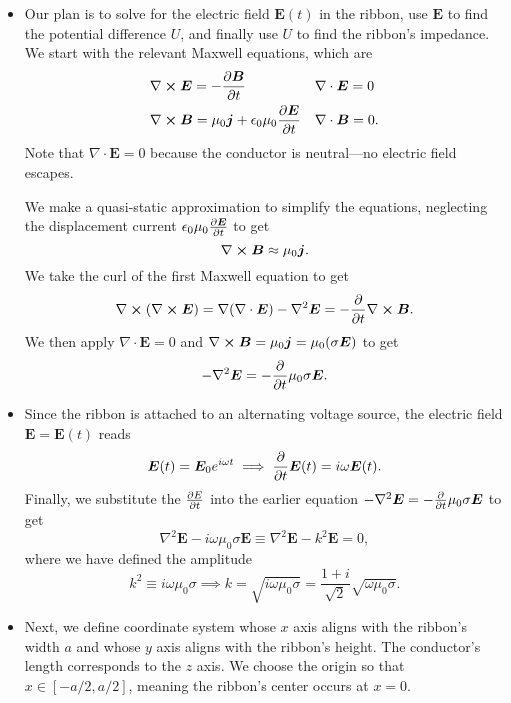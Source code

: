 \documentclass[11pt, a4paper]{article}
\renewcommand{\vec}[1]{\bm{#1}} %
\newcommand{\E}{\vec{E}}  %
\newcommand{\B}{\vec{B}}  %
\newcommand{\ee}{\epsilon_{0}}  %
\newcommand{\mm}{\mu_{0}}  %
\newcommand{\m}{\vec{m}}  %
\renewcommand{\div}{\nabla \cdot}
\renewcommand{\curl}{\nabla \cross}
\renewcommand{\grad}{\nabla}
\renewcommand{\laplacian}{\nabla^{2}}
\begin{document}
\begin{itemize}
	\item Our plan is to solve for the electric field $ \E(t) $ in the ribbon, use $ \E $ to find the potential difference $ U $, and finally use $ U $ to find the ribbon's impedance. We start with the relevant Maxwell equations, which are
	\begin{align*}
		& \curl \E = - \pdv{\B}{t} && \div \E = 0\\
		& \curl \B = \mm \vec{j} + \ee\mm \pdv{\E}{t} && \div \B = 0.
	\end{align*}
	Note that $ \div \E = 0 $ because the conductor is neutral---no electric field escapes.
	
	We make a quasi-static approximation to simplify the equations, neglecting the displacement current $  \ee\mm \pdv{\E}{t} $ to get
	\begin{equation*}
		 \curl \B \approx \mm \vec{j}.
	\end{equation*}
	We take the curl of the first Maxwell equation to get 
	\begin{equation*}
		\curl (\curl \E) = \grad (\div \E) - \laplacian \E  = - \pdv{t} \curl \B.
	\end{equation*}
	We then apply $ \div \E = 0 $ and $ \curl \B = \mm \vec{j} = \mm (\sigma \E) $ to get
	\begin{equation*}
		- \laplacian \E = - \pdv{t} \mm \sigma \E.
	\end{equation*}
	
	\item Since the ribbon is attached to an alternating voltage source, the electric field $ \E = \E(t) $ reads
	\begin{equation*}
		\E(t) = \E_{0} e^{i\omega t} \implies \pdv{t}\E(t) = i \omega \E(t).
	\end{equation*}
	Finally, we substitute the $ \pdv{E}{t} $ into the earlier equation $ - \laplacian \E = - \pdv{t} \mm \sigma \E $ to get
	\begin{equation*}
		\laplacian \E - i \omega \mm \sigma \E \equiv \laplacian \E - k^{2}\E = 0,
	\end{equation*}
	where we have defined the amplitude
	\begin{equation*}
		k^{2} \equiv i \omega \mm \sigma \implies k = \sqrt{i \omega \mm \sigma} = \frac{1 + i}{\sqrt{2}}\sqrt{\omega \mm \sigma}.
	\end{equation*}
	
	
	\item Next, we define coordinate system whose $ x $ axis aligns with the ribbon's width $ a $ and whose $ y $ axis aligns with the ribbon's height. The conductor's length corresponds to the $ z $ axis. We choose the origin so that $ x \in [-a/2, a/2] $, meaning the ribbon's center occurs at $ x = 0 $. 
	

\end{itemize}
\end{document}
